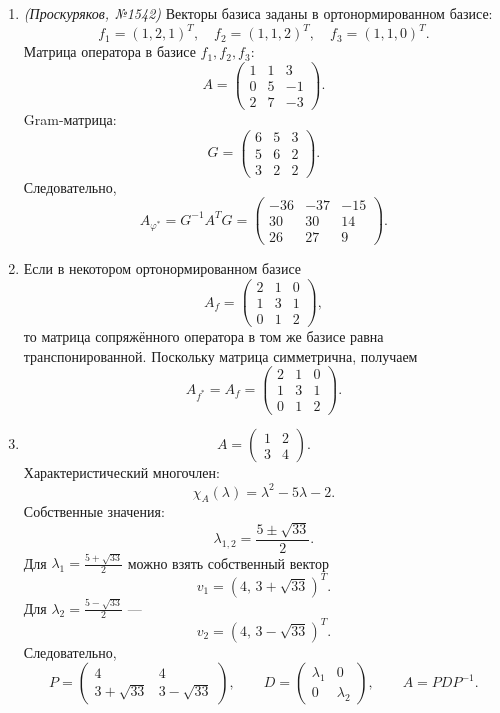 \begin{enumerate}
\item \textit{(Проскуряков, №1542)}
Векторы базиса заданы в ортонормированном базисе:
\[
f_1=(1,2,1)^T,\quad f_2=(1,1,2)^T,\quad f_3=(1,1,0)^T.
\]
Матрица оператора в базисе \(f_1,f_2,f_3\):
\[
A=\begin{pmatrix}
1&1&3\\
0&5&-1\\
2&7&-3
\end{pmatrix}.
\]
Gram-матрица:
\[
G=\begin{pmatrix}
6&5&3\\
5&6&2\\
3&2&2
\end{pmatrix}.
\]
Следовательно,
\[
A_{\varphi^*}=G^{-1}A^TG=
\begin{pmatrix}
-36&-37&-15\\
30&30&14\\
26&27&9
\end{pmatrix}.
\]

\item
Если в некотором ортонормированном базисе
\[
A_f=\begin{pmatrix}
2&1&0\\
1&3&1\\
0&1&2
\end{pmatrix},
\]
то матрица сопряжённого оператора в том же базисе равна транспонированной. Поскольку матрица симметрична, получаем
\[
A_{f^*}=A_f=
\begin{pmatrix}
2&1&0\\
1&3&1\\
0&1&2
\end{pmatrix}.
\]

\item
\[
A=\begin{pmatrix}1&2\\3&4\end{pmatrix}.
\]
Характеристический многочлен:
\[
\chi_A(\lambda)=\lambda^2-5\lambda-2.
\]
Собственные значения:
\[
\lambda_{1,2}=\frac{5\pm\sqrt{33}}2.
\]
Для \(\lambda_1=\frac{5+\sqrt{33}}2\) можно взять собственный вектор
\[
v_1=(4,\,3+\sqrt{33})^T.
\]
Для \(\lambda_2=\frac{5-\sqrt{33}}2\) ---
\[
v_2=(4,\,3-\sqrt{33})^T.
\]
Следовательно,
\[
P=\begin{pmatrix}4&4\\3+\sqrt{33}&3-\sqrt{33}\end{pmatrix},
\qquad
D=\begin{pmatrix}\lambda_1&0\\0&\lambda_2\end{pmatrix},
\qquad
A=PDP^{-1}.
\]


\end{enumerate}
